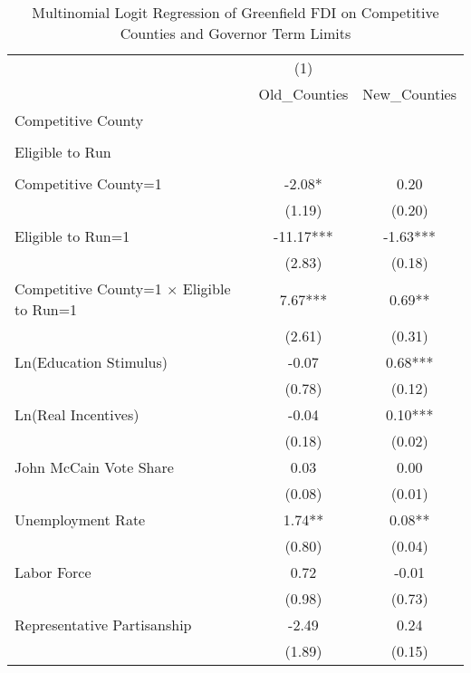\begin{table}[!htbp]\centering
\def\sym#1{\ifmmode^{#1}\else\(^{#1}\)\fi}
\caption{Multinomial Logit Regression of Greenfield FDI on Competitive Counties and Governor Term Limits}
\begin{tabular}{l*{2}{c}}
\hline\hline
                    &         (1)   &               \\
                    &Old_Counties   &New_Counties   \\
\hline
Competitive County  &               &               \\
                    &               &               \\
Eligible to Run     &               &               \\
                    &               &               \\
Competitive County=1&       -2.08*  &        0.20   \\
                    &      (1.19)   &      (0.20)   \\
Eligible to Run=1   &      -11.17***&       -1.63***\\
                    &      (2.83)   &      (0.18)   \\
Competitive County=1 $\times$ Eligible to Run=1&        7.67***&        0.69** \\
                    &      (2.61)   &      (0.31)   \\
Ln(Education Stimulus)&       -0.07   &        0.68***\\
                    &      (0.78)   &      (0.12)   \\
Ln(Real Incentives) &       -0.04   &        0.10***\\
                    &      (0.18)   &      (0.02)   \\
John McCain Vote Share&        0.03   &        0.00   \\
                    &      (0.08)   &      (0.01)   \\
Unemployment Rate   &        1.74** &        0.08** \\
                    &      (0.80)   &      (0.04)   \\
Labor Force         &        0.72   &       -0.01   \\
                    &      (0.98)   &      (0.73)   \\
Representative Partisanship&       -2.49   &        0.24   \\
                    &      (1.89)   &      (0.15)   \\

\end{tabular}
\end{table}

